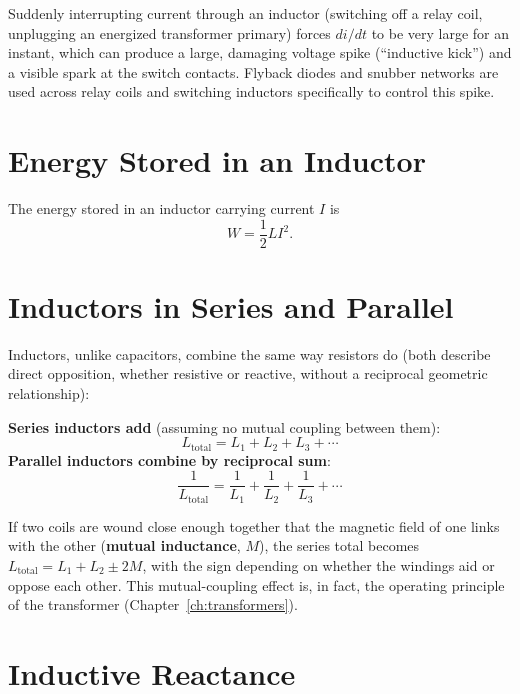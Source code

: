 \begin{safetynote}
Suddenly interrupting current through an inductor (switching off a relay
coil, unplugging an energized transformer primary) forces $di/dt$ to be
very large for an instant, which can produce a large, damaging voltage
spike (``inductive kick'') and a visible spark at the switch contacts.
Flyback diodes and snubber networks are used across relay coils and
switching inductors specifically to control this spike.
\end{safetynote}

\section{Energy Stored in an Inductor}

The energy stored in an inductor carrying current $I$ is
\[
W = \frac{1}{2}LI^2.
\]

\section{Inductors in Series and Parallel}

Inductors, unlike capacitors, combine the same way resistors do (both
describe direct opposition, whether resistive or reactive, without a
reciprocal geometric relationship):


\begin{keyidea}
\textbf{Series inductors add} (assuming no mutual coupling between them):
\[
L_{\text{total}} = L_1 + L_2 + L_3 + \cdots
\]
\textbf{Parallel inductors combine by reciprocal sum}:
\[
\frac{1}{L_{\text{total}}} = \frac{1}{L_1} + \frac{1}{L_2} + \frac{1}{L_3} + \cdots
\]
\end{keyidea}


If two coils are wound close enough together that the magnetic field of
one links with the other (\textbf{mutual inductance}, $M$), the series
total becomes $L_{\text{total}} = L_1 + L_2 \pm 2M$, with the sign
depending on whether the windings aid or oppose each other. This
mutual-coupling effect is, in fact, the operating principle of the
transformer (Chapter~\ref{ch:transformers}).

\section{Inductive Reactance}
\label{sec:xl}

